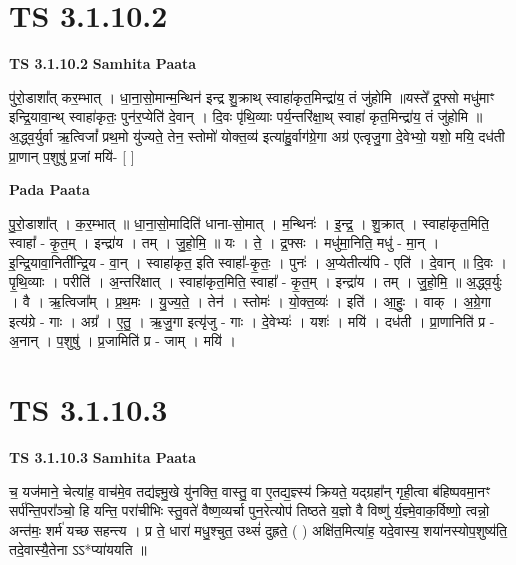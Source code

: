 \documentclass[17pt]{extarticle}
\begin{document}
\section*{ TS 3.1.10.2 }

\textbf{TS 3.1.10.2 } \newline
\textbf{Samhita Paata} \newline

पु॑रो॒डाशा᳚त् कर॒म्भात् । धा॒ना॒सो॒मान्म॒न्थिन॑ इन्द्र शु॒क्राथ् स्वाहा॑कृत॒मिन्द्रा॑य॒ तं जु॑होमि ॥यस्ते᳚ द्र॒फ्सो मधु॑माꣳ इन्द्रि॒यावा॒न्थ् स्वाहा॑कृतः॒ पुन॑र॒प्येति॑ दे॒वान् । दि॒वः पृ॑थि॒व्याः पर्य॒न्तरि॑क्षा॒थ् स्वाहा॑ कृत॒मिन्द्रा॑य॒ तं जु॑होमि ॥ अ॒द्ध्व॒र्युर्वा ऋ॒त्विजां᳚ प्रथ॒मो यु॑ज्यते॒ तेन॒ स्तोमो॑ योक्त॒व्य॑ इत्या॑हु॒र्वाग॑ग्रे॒गा अग्र॑ एत्वृजु॒गा दे॒वेभ्यो॒ यशो॒ मयि॒ दध॑ती प्रा॒णान् प॒शुषु॑ प्र॒जां मयि॑- [  ] \newline

\textbf{Pada Paata} \newline

पु॒रो॒डाशा᳚त् । क॒र॒म्भात् ॥ धा॒ना॒सो॒मादिति॑ धाना-सो॒मात् । म॒न्थिनः॑ । इ॒न्द्र॒ । शु॒क्रात् । स्वाहा॑कृत॒मिति॒ स्वाहा᳚ - कृ॒त॒म् । इन्द्रा॑य । तम् । जु॒हो॒मि॒ ॥ यः । ते॒ । द्र॒फ्सः । मधु॑मा॒निति॒ मधु॑ - मा॒न् । इ॒न्द्रि॒यावा॒निती᳚न्द्रि॒य - वा॒न् । स्वाहा॑कृत॒ इति स्वाहा᳚-कृ॒तः॒ । पुनः॑ । अ॒प्येतीत्य॑पि - एति॑ । दे॒वान् ॥ दि॒वः । पृ॒थि॒व्याः । परीति॑ । अ॒न्तरि॑क्षात् । स्वाहा॑कृत॒मिति॒ स्वाहा᳚ - कृ॒त॒म् । इन्द्रा॑य । तम् । जु॒हो॒मि॒ ॥ अ॒द्ध्व॒र्युः । वै । ऋ॒त्विजा᳚म् । प्र॒थ॒मः । यु॒ज्य॒ते॒ । तेन॑ । स्तोमः॑ । यो॒क्त॒व्यः॑ । इति॑ । आ॒हुः॒ । वाक् । अ॒ग्रे॒गा इत्य॑ग्रे - गाः । अग्र᳚ । ए॒तु॒ । ऋ॒जु॒गा इत्यृ॑जु - गाः । दे॒वेभ्यः॑ । यशः॑ । मयि॑ । दध॑ती । प्रा॒णानिति॑ प्र - अ॒नान् । प॒शुषु॑ । प्र॒जामिति॑ प्र - जाम् । मयि॑ ।  \newline




\section*{ TS 3.1.10.3 }

\textbf{TS 3.1.10.3 } \newline
\textbf{Samhita Paata} \newline

च॒ यज॑माने॒ चेत्या॑ह॒ वाच॑मे॒व तद्य॑ज्ञ्मु॒खे यु॑नक्ति॒ वास्तु॒ वा ए॒तद्य॒ज्ञ्स्य॑ क्रियते॒ यद्ग्रहा᳚न् गृही॒त्वा ब॑हिष्पवमा॒नꣳ सर्प॑न्ति॒परा᳚ञ्चो॒ हि यन्ति॒ परा॑चीभिः स्तु॒वते॑ वैष्ण॒व्यर्चा पुन॒रेत्योप॑ तिष्ठते य॒ज्ञो वै विष्णु॑ र्य॒ज्ञ्मे॒वाक॒र्विष्णो॒ त्वन्नो॒ अन्त॑मः॒ शर्म॑ यच्छ सहन्त्य । प्र ते॒ धारा॑ मधु॒श्चुत॒ उथ्सं॑ दुह्रते॒ ( ) अक्षि॑त॒मित्या॑ह॒ यदे॒वास्य॒ शया॑नस्योप॒शुष्य॑ति॒ तदे॒वास्यै॒तेना ऽऽ*प्या॑ययति ॥ \newline
\end{document}
